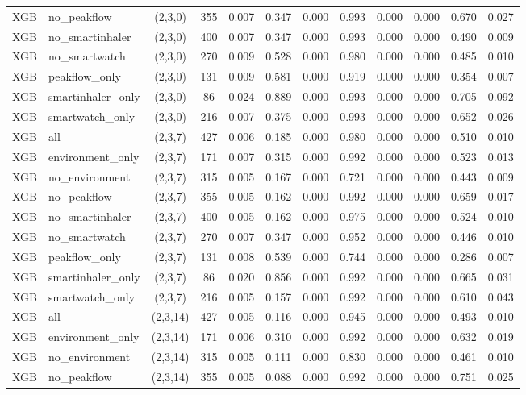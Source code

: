 \begin{longtable}{llcccccccccc}
XGB & no\_peakflow & (2,3,0) & 355 & 0.007 & 0.347 & 0.000 & 0.993 & 0.000 & 0.000 & 0.670 & 0.027 \\
XGB & no\_smartinhaler & (2,3,0) & 400 & 0.007 & 0.347 & 0.000 & 0.993 & 0.000 & 0.000 & 0.490 & 0.009 \\
XGB & no\_smartwatch & (2,3,0) & 270 & 0.009 & 0.528 & 0.000 & 0.980 & 0.000 & 0.000 & 0.485 & 0.010 \\
XGB & peakflow\_only & (2,3,0) & 131 & 0.009 & 0.581 & 0.000 & 0.919 & 0.000 & 0.000 & 0.354 & 0.007 \\
XGB & smartinhaler\_only & (2,3,0) & 86 & 0.024 & 0.889 & 0.000 & 0.993 & 0.000 & 0.000 & 0.705 & 0.092 \\
XGB & smartwatch\_only & (2,3,0) & 216 & 0.007 & 0.375 & 0.000 & 0.993 & 0.000 & 0.000 & 0.652 & 0.026 \\
XGB & all & (2,3,7) & 427 & 0.006 & 0.185 & 0.000 & 0.980 & 0.000 & 0.000 & 0.510 & 0.010 \\
XGB & environment\_only & (2,3,7) & 171 & 0.007 & 0.315 & 0.000 & 0.992 & 0.000 & 0.000 & 0.523 & 0.013 \\
XGB & no\_environment & (2,3,7) & 315 & 0.005 & 0.167 & 0.000 & 0.721 & 0.000 & 0.000 & 0.443 & 0.009 \\
XGB & no\_peakflow & (2,3,7) & 355 & 0.005 & 0.162 & 0.000 & 0.992 & 0.000 & 0.000 & 0.659 & 0.017 \\
XGB & no\_smartinhaler & (2,3,7) & 400 & 0.005 & 0.162 & 0.000 & 0.975 & 0.000 & 0.000 & 0.524 & 0.010 \\
XGB & no\_smartwatch & (2,3,7) & 270 & 0.007 & 0.347 & 0.000 & 0.952 & 0.000 & 0.000 & 0.446 & 0.010 \\
XGB & peakflow\_only & (2,3,7) & 131 & 0.008 & 0.539 & 0.000 & 0.744 & 0.000 & 0.000 & 0.286 & 0.007 \\
XGB & smartinhaler\_only & (2,3,7) & 86 & 0.020 & 0.856 & 0.000 & 0.992 & 0.000 & 0.000 & 0.665 & 0.031 \\
XGB & smartwatch\_only & (2,3,7) & 216 & 0.005 & 0.157 & 0.000 & 0.992 & 0.000 & 0.000 & 0.610 & 0.043 \\
XGB & all & (2,3,14) & 427 & 0.005 & 0.116 & 0.000 & 0.945 & 0.000 & 0.000 & 0.493 & 0.010 \\
XGB & environment\_only & (2,3,14) & 171 & 0.006 & 0.310 & 0.000 & 0.992 & 0.000 & 0.000 & 0.632 & 0.019 \\
XGB & no\_environment & (2,3,14) & 315 & 0.005 & 0.111 & 0.000 & 0.830 & 0.000 & 0.000 & 0.461 & 0.010 \\
XGB & no\_peakflow & (2,3,14) & 355 & 0.005 & 0.088 & 0.000 & 0.992 & 0.000 & 0.000 & 0.751 & 0.025 \\

\end{longtable}
